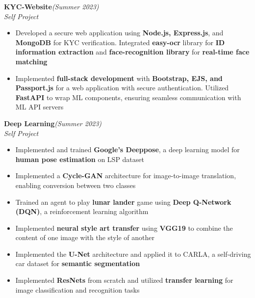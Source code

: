 \documentclass[a4paper,10pt]{article}
\begin{document}
\vspace{\baselineskip}
\vspace{-15pt}
\noindent\textbf{\large KYC-Website}\hfill{\sl \small (Summer 2023)}\\
{\it Self Project}
\\\vspace{-17pt}
\begin{itemize}[itemsep = -1.4 mm, leftmargin=*]
    \item Developed a secure web application using \textbf{Node.js, Express.js}, and \textbf{MongoDB} for KYC verification. Integrated \textbf{easy-ocr} library for \textbf{ID information extraction} and \textbf{face-recognition library} for \textbf{real-time face matching}
    \item Implemented \textbf{full-stack development} with \textbf{Bootstrap, EJS, and Passport.js} for a web application with secure authentication. Utilized \textbf{FastAPI} to wrap ML components, ensuring seamless communication with ML API servers
\end{itemize}

\vspace{\baselineskip}
\vspace{-15pt}
\noindent\textbf{\large Deep Learning}\hfill{\sl \small (Summer 2023)}\\
{\it Self Project}
\\\vspace{-17pt}
\begin{itemize}[itemsep = -1.4 mm, leftmargin=*]
    \item Implemented and trained \textbf{Google's Deeppose}, a deep learning model for \textbf{human pose estimation} on LSP dataset
    \item Implemented a \textbf{Cycle-GAN} architecture for image-to-image translation, enabling conversion between two classes 
    \item Trained an agent to play \textbf{lunar lander} game using \textbf{Deep Q-Network (DQN)}, a reinforcement learning algorithm
    \item Implemented \textbf{neural style art transfer} using \textbf{VGG19} to combine the content of one image with the style of another
    \item Implemented the \textbf{U-Net} architecture and applied it to CARLA, a self-driving car dataset for \textbf{semantic segmentation}
    \item Implemented \textbf{ResNets} from scratch and utilized \textbf{transfer learning} for image classification and recognition tasks
\end{itemize}
\end{document}
